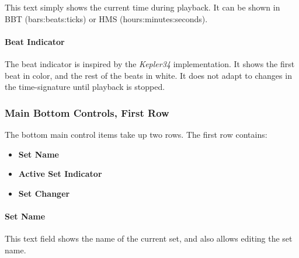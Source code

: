 \documentclass[
 11pt,
 twoside,
 a4paper,
 final                                 %
]{article}
\begin{document}
   This text simply shows the current time during playback. 
   It can be shown in BBT (bars:beats:ticks) or HMS (hours:minutes:seconds).

\paragraph{Beat Indicator}
\label{paragraph:introduction_beat_indicator}

   The beat indicator is inspired by the \textsl{Kepler34} implementation.  It
   shows the first beat in color, and the rest of the beats in white.
   It does not adapt to changes in the time-signature until
   playback is stopped.

\subsubsection{Main Bottom Controls, First Row}
\label{subsubsec:introduction_main_bottom_controls}

   The bottom main control items take up two rows.  The first row contains:

   \begin{itemize}
      \item \textbf{Set Name}
      \item \textbf{Active Set Indicator}
      \item \textbf{Set Changer}
   \end{itemize}

\paragraph{Set Name}
\label{paragraph:introduction_set_name}

   This text field shows the name of the current set, and also allows editing
   the set name.

\begin{comment}

\paragraph{Set Master Button}
\label{paragraph:introduction_set_master_button}

   This button brings up an external window showing the \textbf{Set Master}
   panel.  This panel is also available in a center tab.  It is a work in
   progress, and doesn't have a whole lot of functionality yet.
   It can currently show existing sets in one view, and allow
   reordering the sets.

\end{comment}
\end{document}
